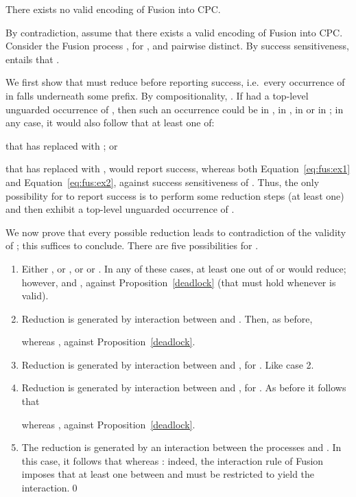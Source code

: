 \documentclass{LMCS}
\begin{document}
\begin{thm}
\label{thm:fusionNoinCPC}
There exists no valid encoding of Fusion into CPC.
\end{thm}
\proof
By contradiction, assume that there exists a valid encoding 
of Fusion into CPC.
Consider the Fusion process ,
for ,  and  pairwise distinct. By success sensitiveness, 
entails that . 

We first show that  must reduce before reporting success,
i.e.\ every occurrence of  in  falls underneath
some prefix.  By compositionality, .  If  had a top-level unguarded occurrence
of , then such an occurrence could be in , in , in
 or in ; in any case, it
would also follow that at least one of:

that has  replaced with ;
or

that has  replaced with ,
would report success, 
whereas both
Equation~\ref{eq:fus:ex1}
and
Equation~\ref{eq:fus:ex2},
against success sensitiveness of .
Thus, the only possibility for  to report success is
to perform some reduction steps (at least one) and then exhibit
a top-level unguarded occurrence of .

We now prove that every possible reduction leads to contradiction of the validity of ;
this suffices to conclude. There are five possibilities for .
\begin{enumerate}
	\item Either , or
				, or 
				 or . In any
				of these cases, at least one out of 
				 or
				 would reduce;
				however,  and
				, 
				against Proposition~\ref{deadlock} (that must hold whenever 
				is valid).

	\item Reduction is generated by interaction between
				 and
				.  Then, as before, 
				
				whereas , 
				against Proposition~\ref{deadlock}.

	\item Reduction is generated by interaction between
				 and , for
				. Like case 2.

	\item Reduction is generated by interaction between
				 and , for
				. As before it follows that
				
				whereas , 
				against Proposition~\ref{deadlock}.

	\item The reduction is generated by an interaction between the processes
				 and . In this
				case, it follows that 
				whereas : indeed, the interaction
				rule of Fusion imposes that at least one between  and  must
				be restricted to yield the interaction.\qed
\end{enumerate}
\end{document}
